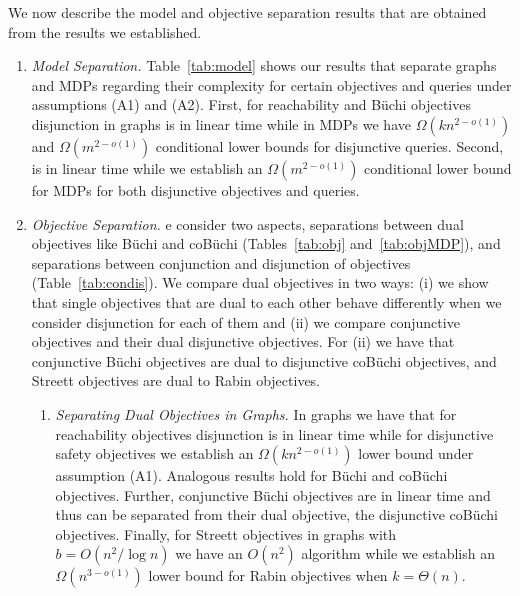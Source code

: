 \documentclass[11pt,letterpaper]{article}
\newif\iffullversion
\newcommand{\infull}[1]{\iffullversion #1\fi}
\newcommand{\inshort}[1]{\iffullversion \else #1\fi}
\begin{document}
\smallskip{} 
We now describe the model and objective separation results that are obtained 
from the results we established.
\begin{enumerate}
\item
\emph{Model Separation.} 
    Table~\ref{tab:model} shows our results that 
    separate graphs and MDPs regarding their complexity for certain 
    objectives and queries under assumptions (A1) and (A2).
    First, 
    for reachability and Büchi objectives disjunction in graphs is in linear time 
    while in MDPs we have $\Omega(kn^{2-o(1)})$ and $\Omega(m^{2-o(1)})$ conditional 
    lower bounds for disjunctive queries. 
    Second, \infull{for coBüchi we have a separation when restricted to the 
    class where each target set is a singleton. 
    For these objectives disjunction in graphs} 
    is in linear time while 
    we establish an $\Omega(m^{2-o(1)})$ conditional lower bound for MDPs for both 
    disjunctive objectives and queries.
    
\item
\emph{Objective Separation.}
    \infull{Further we identify complexity separations between different objectives. 
    Here w}e consider two aspects, separations between dual objectives like Büchi and 
    coBüchi (Tables~\ref{tab:obj} and~\ref{tab:objMDP}), and separations between 
    conjunction and disjunction of objectives (Table~\ref{tab:condis}).
    We compare dual objectives in two ways: (i) we show that single objectives
    that are dual to each other behave differently when we consider 
    disjunction for each of them and (ii) we compare conjunctive objectives
    and their dual disjunctive objectives. For (ii) we have that 
    conjunctive Büchi objectives are dual to disjunctive coBüchi objectives,
    and Streett objectives\infull{, the conjunction of 1-pair Streett objectives,} are 
    dual to Rabin objectives\infull{, the disjunction of 1-pair Rabin objectives}.
    
    \begin{enumerate}
\item
\emph{Separating Dual Objectives in Graphs.}
		\infull{First, we consider reachability and safety objectives. }In graphs we have 
		that for reachability objectives disjunction
		is in linear time while for disjunctive safety objectives we establish an 
		$\Omega(k n^{2-o(1)})$ 
		lower bound under assumption (A1). \inshort{Analogous results hold for Büchi and coBüchi objectives.}\infull{Analogously, we have 
		disjunctive Büchi objectives are in linear time on graphs
		while we establish an $\Omega(k n^{2-o(1)})$ conditional lower bound for disjunction of coBüchi objectives.}
		Further, conjunctive Büchi objectives are in linear time and thus can 
		be separated from their dual objective, the disjunctive coBüchi objectives.
		Finally, for Streett objectives in graphs with $b = O(n^2 / \log n)$ 
		we have an $O(n^2)$ algorithm while we establish an 
		$\Omega(n^{3-o(1)})$ lower bound for Rabin objectives when $k = \Theta(n)$.
		

\end{enumerate}
\end{enumerate}
\end{document}
